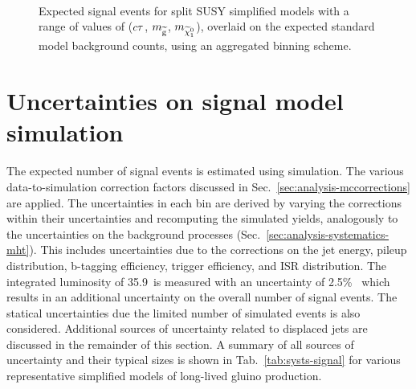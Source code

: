\begin{figure}[!ht]
~~
\\
\caption{Expected signal events for split SUSY simplified models with a range 
of values of ($c\tau$, $m_{\mathrm{\widetilde{g}}}$, $m_{\widetilde{\chi}_1^0}$), overlaid on the expected standard 
model background counts, using an aggregated binning scheme.}
\label{fig:T1qqqqLL_MR}
\end{figure}


\section{Uncertainties on signal model simulation}
The expected number of signal events is estimated using simulation. The various 
data-to-simulation correction factors discussed in 
Sec.~\ref{sec:analysis-mccorrections} are applied. The uncertainties in each 
\njnbhtmht bin are derived by varying the corrections within their 
uncertainties and recomputing the simulated yields, analogously to the 
uncertainties on the background processes 
(Sec.~\ref{sec:analysis-systematics-mht}). 
This includes uncertainties due to the corrections on the jet energy, pileup 
distribution, b-tagging efficiency, trigger efficiency, and ISR distribution. 
The integrated luminosity of 35.9~\ifb is measured with an uncertainty of 
2.5\%~\cite{lumi2016} which results in an additional uncertainty on the overall 
number of signal events. The statical uncertainties due the limited number of 
simulated events is also considered. Additional sources of uncertainty related 
to displaced jets are discussed in the remainder of this section. A summary of 
all sources of uncertainty and their typical sizes is shown in 
Tab.~\ref{tab:systs-signal} for various representative simplified models of 
long-lived gluino production.

